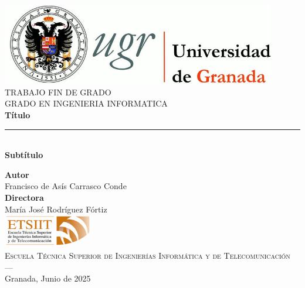 \begin{titlepage}
\newlength{\centeroffset}
\setlength{\centeroffset}{-0.5\oddsidemargin}
\addtolength{\centeroffset}{0.5\evensidemargin}
\thispagestyle{empty}

\noindent\hspace*{\centeroffset}\begin{minipage}{\textwidth}

\centering
\includegraphics[width=0.9\textwidth]{logos/logo_ugr.jpg}\\[1.4cm]

\textsc{ \Large TRABAJO FIN DE GRADO\\[0.2cm]}
\textsc{ GRADO EN INGENIERIA INFORMATICA}\\[1cm]

{\Huge\bfseries Título \\}
\noindent\rule[-1ex]{\textwidth}{3pt}\\[3.5ex]
{\large\bfseries Subtítulo }
\end{minipage}

\vspace{2.5cm}
\noindent\hspace*{\centeroffset}
\begin{minipage}{\textwidth}
\centering

\textbf{Autor}\\ {Francisco de Asís Carrasco Conde}\\[2.5ex]
\textbf{Directora}\\ {María José Rodríguez Fórtiz}\\[2cm]
\includegraphics[width=0.3\textwidth]{logos/etsiit_logo.png}\\[0.1cm]
\textsc{Escuela Técnica Superior de Ingenierías Informática y de Telecomunicación}\\
\textsc{---}\\
Granada, Junio de 2025
\end{minipage}
\end{titlepage}
